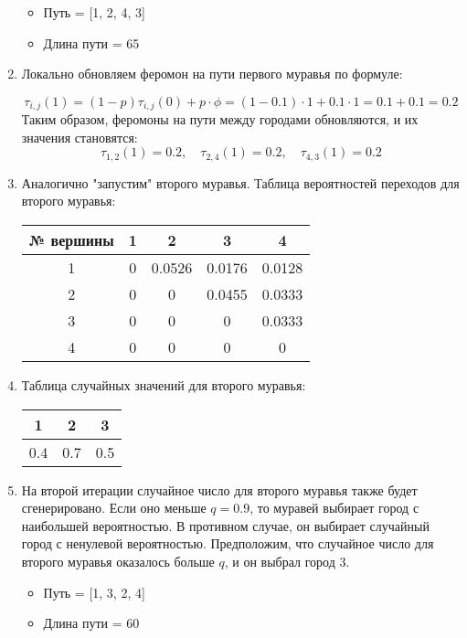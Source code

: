 \documentclass[14pt]{article}
\begin{document}
\begin{enumerate}
    \begin{itemize}
        \item Путь = [1, 2, 4, 3]
        \item Длина пути = 65
    \end{itemize}
    
    \item Локально обновляем феромон на пути первого муравья по формуле:

    \[
    \tau_{i,j}(1) = (1 - p) \tau_{i,j}(0) + p \cdot \phi = (1 - 0.1) \cdot 1 + 0.1 \cdot 1 = 0.1 + 0.1 = 0.2
    \]
    Таким образом, феромоны на пути между городами обновляются, и их значения становятся:
    \[
    \tau_{1,2}(1) = 0.2, \quad \tau_{2,4}(1) = 0.2, \quad \tau_{4,3}(1) = 0.2
    \]

    \item Аналогично "запустим" второго муравья. Таблица вероятностей переходов для второго муравья:\\
    \begin{tabular}{|c|c|c|c|c|}
        \hline
        № вершины & 1 & 2 & 3 & 4 \\
        \hline
        1 & 0 & 0.0526 & 0.0176 & 0.0128 \\
        2 & 0 & 0 & 0.0455 & 0.0333 \\
        3 & 0 & 0 & 0 & 0.0333 \\
        4 & 0 & 0 & 0 & 0 \\
        \hline
    \end{tabular}
    
    \item Таблица случайных значений для второго муравья:\\
    \begin{tabular}{|c|c|c|}
        \hline
        1 & 2 & 3 \\
        \hline
        0.4 & 0.7 & 0.5 \\
        \hline
    \end{tabular}
    
    \item На второй итерации случайное число для второго муравья также будет сгенерировано. Если оно меньше $q = 0.9$, то муравей выбирает город с наибольшей вероятностью. В противном случае, он выбирает случайный город с ненулевой вероятностью. Предположим, что случайное число для второго муравья оказалось больше $q$, и он выбрал город 3.
    
    \begin{itemize}
        \item Путь = [1, 3, 2, 4]
        \item Длина пути = 60
    \end{itemize}
    

\end{enumerate}
\end{document}
